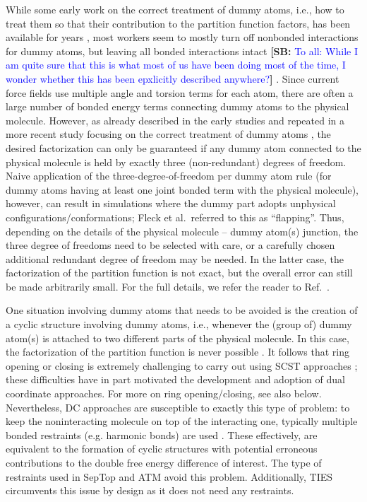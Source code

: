 \documentclass[9pt,bestpractices]{livecoms}
\newcommand{\sbnote}[1]{%
  {\bfseries{}[SB: }%
  {\textcolor{blue}{#1}}{\bfseries{}]}
}
\begin{document}
While some early work on the correct treatment of dummy atoms, i.e., how to treat them so that their contribution to the partition function factors, has been available for years \cite{Boresch_2002,Shobana_2000,Wang_2012}, most workers seem to mostly turn off nonbonded interactions for dummy atoms, but leaving all bonded interactions intact \sbnote{To all: While I am quite sure that this is what most of us have been doing most of the time, I wonder whether this has been epxlicitly described anywhere?}. Since current force fields use multiple angle and torsion terms for each atom, there are often a large number of bonded energy terms connecting dummy atoms to the physical molecule. However, as already described in the early studies and repeated in a more recent study focusing on the correct treatment of dummy atoms \cite{Fleck_2021}, the desired factorization can only be guaranteed if any dummy atom connected to the physical molecule is held by exactly three (non-redundant) degrees of freedom. Naive application of the three-degree-of-freedom per dummy atom rule (for dummy atoms having at least one joint bonded term with the physical molecule), however, can result in simulations where the dummy part adopts unphysical configurations/conformations; Fleck et al.\ referred to this as “flapping”. Thus, depending on the details of the physical molecule -- dummy atom(s) junction, the three degree of freedoms need to be selected with care, or a carefully chosen additional redundant degree of freedom may be needed. In the latter case, the factorization of the partition function is not exact, but the overall error can still be made arbitrarily small. For the full details, we refer the reader to Ref.~\cite{Fleck_2021}. 

One situation involving dummy atoms that needs to be avoided is the creation of a cyclic structure involving dummy atoms, i.e., whenever the (group of) dummy atom(s) is attached to two different parts of the physical molecule. In this case, the factorization of the partition function is never possible \cite{Shobana_2000}. It follows that ring opening or closing is extremely challenging to carry out using SCST approaches \cite{liu2015ring}; these difficulties have in part motivated the development and adoption of dual coordinate approaches. For more on ring opening/closing, see also below. Nevertheless, DC approaches are susceptible to exactly this type of problem: to keep the noninteracting molecule on top of the interacting one, typically multiple bonded restraints (e.g. harmonic bonds) are used \cite{Axelsen_1998,Ries_2022}. These effectively, are equivalent to the formation of cyclic structures with potential erroneous contributions to the double free energy difference of interest. The type of restraints used in SepTop \cite{rocklin2013separated,Baumann_2023} and ATM \cite{Azimi_2022} avoid this problem.
Additionally, TIES~\cite{bhati2017} circumvents this issue by design as it does not need any restraints.
\end{document}
